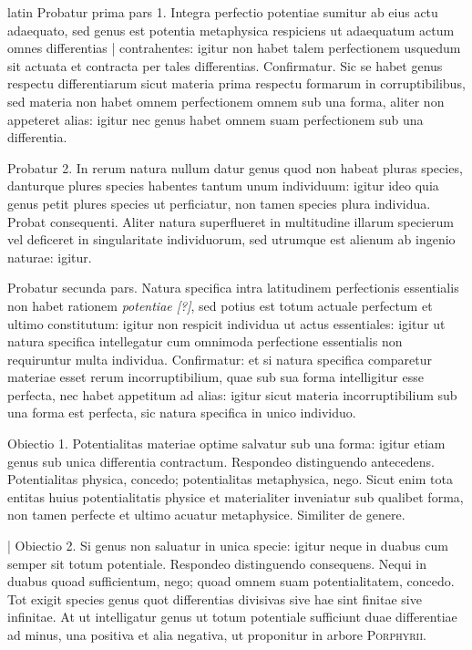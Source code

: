 \begin{otherlanguage*}{latin}
\pstart
Probatur prima pars 1. Integra perfectio potentiae sumitur ab eius actu adaequato, sed genus est potentia metaphysica respiciens ut adaequatum actum omnes differentias \textnormal{|} contrahentes:
igitur non habet talem perfectionem usquedum sit actuata et contracta per tales differentias. Confirmatur. Sic se habet genus respectu differentiarum sicut materia prima respectu formarum in corruptibilibus, sed materia non habet omnem perfectionem omnem sub una forma, aliter non appeteret alias:
igitur nec genus habet omnem suam perfectionem sub una differentia. 
\pend

\pstart
Probatur 2. In rerum natura nullum datur genus quod non habeat pluras species, danturque plures species habentes tantum unum individuum:
igitur ideo quia genus petit plures species ut perficiatur, non tamen species plura individua. Probat consequenti. Aliter natura superflueret in multitudine illarum specierum vel deficeret in singularitate individuorum, sed utrumque est alienum ab ingenio naturae:
igitur. 
\pend

\pstart
Probatur secunda pars. Natura specifica intra latitudinem perfectionis essentialis non habet rationem \emph{potentiae [?]}, sed potius est totum actuale perfectum et ultimo constitutum:
igitur non respicit individua ut actus essentiales:
igitur ut natura specifica intellegatur cum omnimoda perfectione essentialis non requiruntur multa individua. Confirmatur:
et si natura specifica comparetur materiae esset rerum incorruptibilium, quae sub sua forma intelligitur esse perfecta, nec habet appetitum ad alias:
igitur sicut materia incorruptibilium sub una forma est perfecta, sic natura specifica in unico individuo. 
\pend

\pstart
Obiectio 1. Potentialitas materiae optime salvatur sub una forma:
igitur etiam genus sub unica differentia contractum. Respondeo distinguendo antecedens. Potentialitas physica, concedo; potentialitas metaphysica, nego. Sicut enim tota entitas huius potentialitatis physice et materialiter inveniatur sub qualibet forma, non tamen perfecte et ultimo acuatur metaphysice. Similiter de genere. 
\pend

\pstart
\textnormal{|} Obiectio 2. Si genus non saluatur in unica specie:
igitur neque in duabus cum semper sit totum potentiale. Respondeo distinguendo consequens. Nequi in duabus quoad sufficientum, nego; quoad omnem suam potentialitatem, concedo. Tot exigit species genus quot differentias divisivas sive hae sint finitae sive infinitae. At ut intelligatur genus ut totum potentiale sufficiunt duae differentiae ad minus, una positiva et alia negativa, ut proponitur in arbore \textsc{Porphyrii}. 
\pend


\end{otherlanguage*}
